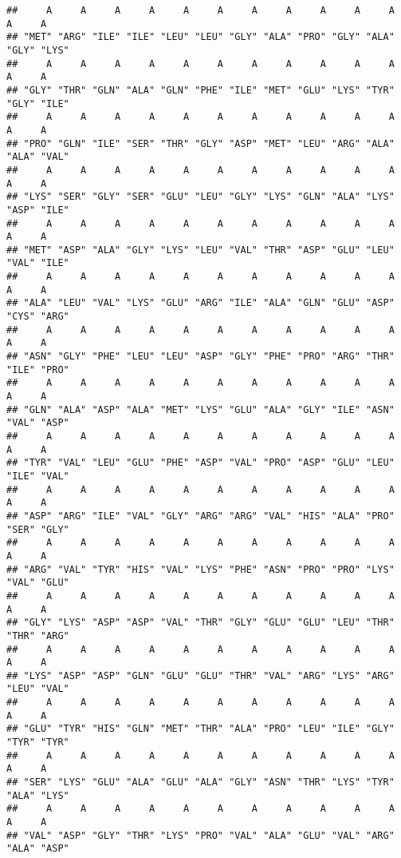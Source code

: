 \documentclass[]{article}
\begin{document}
\begin{verbatim}
##     A     A     A     A     A     A     A     A     A     A     A     A     A 
## "MET" "ARG" "ILE" "ILE" "LEU" "LEU" "GLY" "ALA" "PRO" "GLY" "ALA" "GLY" "LYS" 
##     A     A     A     A     A     A     A     A     A     A     A     A     A 
## "GLY" "THR" "GLN" "ALA" "GLN" "PHE" "ILE" "MET" "GLU" "LYS" "TYR" "GLY" "ILE" 
##     A     A     A     A     A     A     A     A     A     A     A     A     A 
## "PRO" "GLN" "ILE" "SER" "THR" "GLY" "ASP" "MET" "LEU" "ARG" "ALA" "ALA" "VAL" 
##     A     A     A     A     A     A     A     A     A     A     A     A     A 
## "LYS" "SER" "GLY" "SER" "GLU" "LEU" "GLY" "LYS" "GLN" "ALA" "LYS" "ASP" "ILE" 
##     A     A     A     A     A     A     A     A     A     A     A     A     A 
## "MET" "ASP" "ALA" "GLY" "LYS" "LEU" "VAL" "THR" "ASP" "GLU" "LEU" "VAL" "ILE" 
##     A     A     A     A     A     A     A     A     A     A     A     A     A 
## "ALA" "LEU" "VAL" "LYS" "GLU" "ARG" "ILE" "ALA" "GLN" "GLU" "ASP" "CYS" "ARG" 
##     A     A     A     A     A     A     A     A     A     A     A     A     A 
## "ASN" "GLY" "PHE" "LEU" "LEU" "ASP" "GLY" "PHE" "PRO" "ARG" "THR" "ILE" "PRO" 
##     A     A     A     A     A     A     A     A     A     A     A     A     A 
## "GLN" "ALA" "ASP" "ALA" "MET" "LYS" "GLU" "ALA" "GLY" "ILE" "ASN" "VAL" "ASP" 
##     A     A     A     A     A     A     A     A     A     A     A     A     A 
## "TYR" "VAL" "LEU" "GLU" "PHE" "ASP" "VAL" "PRO" "ASP" "GLU" "LEU" "ILE" "VAL" 
##     A     A     A     A     A     A     A     A     A     A     A     A     A 
## "ASP" "ARG" "ILE" "VAL" "GLY" "ARG" "ARG" "VAL" "HIS" "ALA" "PRO" "SER" "GLY" 
##     A     A     A     A     A     A     A     A     A     A     A     A     A 
## "ARG" "VAL" "TYR" "HIS" "VAL" "LYS" "PHE" "ASN" "PRO" "PRO" "LYS" "VAL" "GLU" 
##     A     A     A     A     A     A     A     A     A     A     A     A     A 
## "GLY" "LYS" "ASP" "ASP" "VAL" "THR" "GLY" "GLU" "GLU" "LEU" "THR" "THR" "ARG" 
##     A     A     A     A     A     A     A     A     A     A     A     A     A 
## "LYS" "ASP" "ASP" "GLN" "GLU" "GLU" "THR" "VAL" "ARG" "LYS" "ARG" "LEU" "VAL" 
##     A     A     A     A     A     A     A     A     A     A     A     A     A 
## "GLU" "TYR" "HIS" "GLN" "MET" "THR" "ALA" "PRO" "LEU" "ILE" "GLY" "TYR" "TYR" 
##     A     A     A     A     A     A     A     A     A     A     A     A     A 
## "SER" "LYS" "GLU" "ALA" "GLU" "ALA" "GLY" "ASN" "THR" "LYS" "TYR" "ALA" "LYS" 
##     A     A     A     A     A     A     A     A     A     A     A     A     A 
## "VAL" "ASP" "GLY" "THR" "LYS" "PRO" "VAL" "ALA" "GLU" "VAL" "ARG" "ALA" "ASP" 

\end{verbatim}
\end{document}
